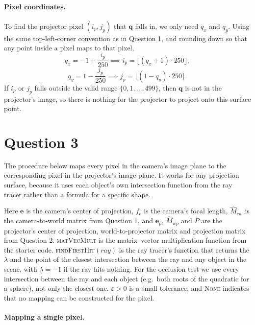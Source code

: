 \documentclass[11pt]{article}
\newcommand{\vect}[1]{\mathbf{#1}}
\begin{document}
\paragraph{Pixel coordinates.}
To find the projector pixel $(i_p, j_p)$ that $\vect{q}$ falls in, we only need $q_x$ and
$q_y$. Using the same top-left-corner convention as in Question 1, and rounding down so that
any point inside a pixel maps to that pixel,
\[
  q_x = -1 + \frac{i_p}{250} \implies i_p = \bigl\lfloor (q_x + 1) \cdot 250 \bigr\rfloor,
\]
\[
  q_y = 1 - \frac{j_p}{250} \implies j_p = \bigl\lfloor (1 - q_y) \cdot 250 \bigr\rfloor.
\]
If $i_p$ or $j_p$ falls outside the valid range $\{0, 1, \dots, 499\}$, then $\vect{q}$ is
not in the projector's image, so there is nothing for the projector to project onto this
surface point.

\section*{Question 3}

The procedure below maps every pixel in the camera's image plane to the corresponding
pixel in the projector's image plane. It works for any projection surface, because it
uses each object's own intersection function from the ray tracer rather than a formula
for a specific shape.

Here $\vect{e}$ is the camera's center of projection, $f_c$ is the camera's focal length,
$\hat{M}_{cw}$ is the camera-to-world matrix from Question 1, and $\vect{e}_p$,
$\hat{M}_{wp}$ and $P$ are the projector's center of projection, world-to-projector matrix
and projection matrix from Question 2. \textsc{matVecMult} is the matrix--vector
multiplication function from the starter code. \textsc{findFirstHit}$(\textit{ray})$
is the ray tracer's function that returns the $\lambda$ and the point of the closest
intersection between the ray and any object in the scene, with $\lambda = -1$ if the ray
hits nothing. For the occlusion test we use every intersection between the ray and each
object (e.g.\ both roots of the quadratic for a sphere), not only the closest one.
$\varepsilon > 0$ is a small tolerance, and \textsc{None} indicates that no mapping can be
constructed for the pixel.

\paragraph{Mapping a single pixel.}
\end{document}
